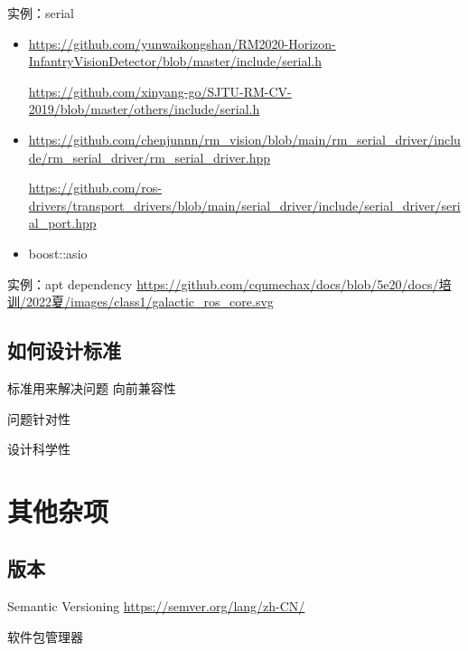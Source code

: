\begin{frame}{实例：serial}
    \begin{itemize}
        \item \url{https://github.com/yunwaikongshan/RM2020-Horizon-InfantryVisionDetector/blob/master/include/serial.h}
        
        \url{https://github.com/xinyang-go/SJTU-RM-CV-2019/blob/master/others/include/serial.h}
        
        \item \url{https://github.com/chenjunnn/rm_vision/blob/main/rm_serial_driver/include/rm_serial_driver/rm_serial_driver.hpp}
        
        \url{https://github.com/ros-drivers/transport_drivers/blob/main/serial_driver/include/serial_driver/serial_port.hpp}
        
        \item boost::asio
    \end{itemize}
\end{frame}

\begin{frame}{实例：apt dependency}
    \url{https://github.com/cqumechax/docs/blob/5e20/docs/培训/2022夏/images/class1/galactic_ros_core.svg}
\end{frame}

\subsection{如何设计标准}

\begin{frame}{标准用来解决问题}
    向前兼容性
    
    问题针对性
    
    设计科学性
\end{frame}

\section{其他杂项}

\subsection{版本}

\begin{frame}{Semantic Versioning}
    \url{https://semver.org/lang/zh-CN/}
\end{frame}

\begin{frame}{软件包管理器}
    
\end{frame}

